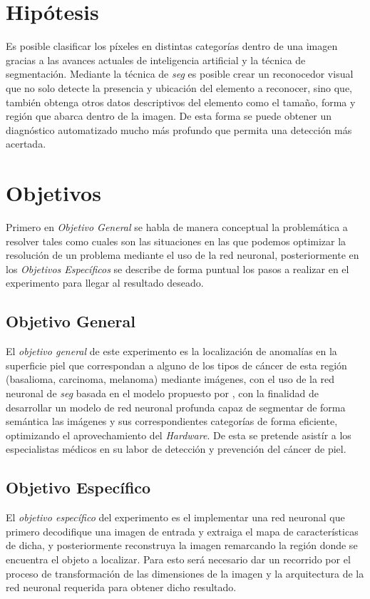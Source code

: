 \section{Hipótesis}
Es posible clasificar los píxeles en distintas categorías dentro de una imagen gracias a las avances actuales de inteligencia artificial y la técnica de segmentación. Mediante la técnica de \emph{\gls{seg}} es posible crear un reconocedor visual que no solo detecte la presencia y ubicación del elemento a reconocer, sino que, también obtenga otros datos descriptivos del elemento como el tamaño, forma y región que abarca dentro de la imagen. De esta forma se puede obtener un diagnóstico automatizado mucho más profundo que permita una detección más acertada.


\section{Objetivos}
Primero en \emph{Objetivo General} se habla de manera conceptual la problemática a resolver tales como cuales son las situaciones en las que podemos optimizar la resolución de un problema mediante el uso de la red neuronal, posteriormente en los \emph{Objetivos Específicos} se describe de forma puntual los pasos a realizar en el experimento para llegar al resultado deseado.

\subsection{Objetivo General}
El \emph{objetivo general} de este experimento es la localización de anomalías en la superficie piel que correspondan a alguno de los tipos de cáncer de esta región (basalioma, carcinoma, melanoma) mediante imágenes, con el uso de la red neuronal de \emph{\gls{seg}} basada en el modelo propuesto por \citet{wu2019fastfcn}, con la finalidad de desarrollar un modelo de red neuronal profunda capaz de segmentar de forma semántica las imágenes y sus correspondientes categorías de forma eficiente, optimizando el aprovechamiento del \emph{Hardware}. De esta se pretende asistír a los especialistas médicos en su labor de detección y prevención del cáncer de piel.


\subsection{Objetivo Específico}
El \emph{objetivo específico} del experimento es el implementar una red neuronal que primero decodifique una imagen de entrada y extraiga el mapa de características de dicha, y posteriormente reconstruya la imagen remarcando la región donde se encuentra el objeto a localizar. Para esto será necesario dar un recorrido por el proceso de transformación de las dimensiones de la imagen y la arquitectura de la red neuronal requerida para obtener dicho resultado.

